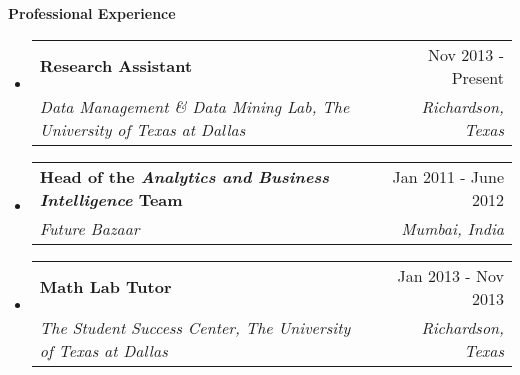 \documentclass[letterpaper,11pt]{article}
\makeatletter
\newcommand{\resitem}[1]{\item[\ding{226}] #1 \vspace{-2pt}}
\newcommand{\resheading}[1]{{\large \colorbox{mygrey}{\begin{minipage}{\textwidth}{\textbf{#1 \vphantom{p\^{E}}}}\end{minipage}}}}
\newcommand{\ressubheading}[4]{
\begin{tabular*}{7.0in}{l@{\extracolsep{\fill}}r}
		\textbf{#1} & #2 \\
		\textit{#3} & \textit{#4} \\
\end{tabular*}\vspace{-6pt}}
\makeatother
\begin{document}
\resheading{Professional Experience}
\begin{itemize}
\item
	\ressubheading{Research Assistant}{Nov 2013 - Present}{Data Management \& Data Mining Lab, The University of Texas at Dallas}{Richardson, Texas}

\item
	\ressubheading{Head of the \textit{Analytics and Business Intelligence} Team}{Jan 2011 - June 2012}{Future Bazaar}{Mumbai, India}

\item
	\ressubheading{Math Lab Tutor}{Jan 2013 - Nov 2013}{The Student Success Center, The University of Texas at Dallas}{Richardson, Texas} 

\end{itemize}

%
%
\end{document}
